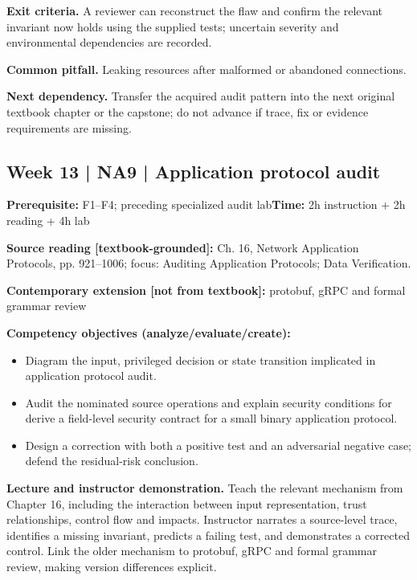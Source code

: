 \documentclass[10pt,letterpaper]{article}
\begin{document}
\textbf{Exit criteria.} A reviewer can reconstruct the flaw and confirm the relevant invariant now holds using the supplied tests; uncertain severity and environmental dependencies are recorded.

\textbf{Common pitfall.} Leaking resources after malformed or abandoned connections.

\textbf{Next dependency.} Transfer the acquired audit pattern into the next original textbook chapter or the capstone; do not advance if trace, fix or evidence requirements are missing.

\subsection{Week 13 | NA9 | Application protocol audit}
\textbf{Prerequisite:} F1--F4; preceding specialized audit lab\hfill\textbf{Time:} 2h instruction + 2h reading + 4h lab

\textbf{Source reading [textbook-grounded]:} Ch. 16, Network Application Protocols, pp. 921--1006; focus: Auditing Application Protocols; Data Verification.

\textbf{Contemporary extension [not from textbook]:} protobuf, gRPC and formal grammar review

\textbf{Competency objectives (analyze/evaluate/create):}
\begin{itemize}[leftmargin=*,itemsep=2pt]
\item Diagram the input, privileged decision or state transition implicated in application protocol audit.
\item Audit the nominated source operations and explain security conditions for derive a field-level security contract for a small binary application protocol.
\item Design a correction with both a positive test and an adversarial negative case; defend the residual-risk conclusion.
\end{itemize}
\textbf{Lecture and instructor demonstration.} Teach the relevant mechanism from Chapter 16, including the interaction between input representation, trust relationships, control flow and impacts. Instructor narrates a source-level trace, identifies a missing invariant, predicts a failing test, and demonstrates a corrected control. Link the older mechanism to protobuf, gRPC and formal grammar review, making version differences explicit.
\end{document}
